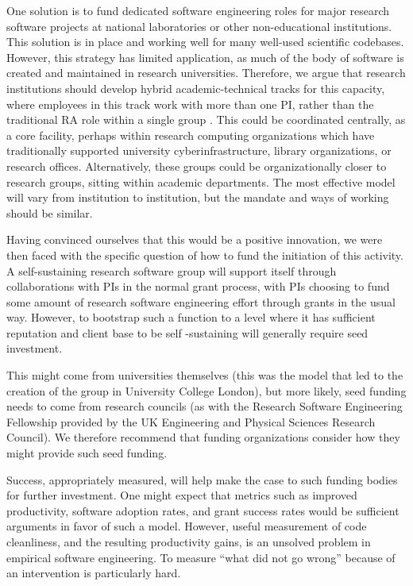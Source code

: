 One solution is to fund dedicated software engineering roles for major research software projects at national laboratories
or other non-educational institutions. This solution is in place and working well for many well-used scientific codebases.
However, this strategy has limited application, as much of the body of software is created and maintained in research
universities. Therefore, we argue that research institutions should develop hybrid academic-technical tracks for this
capacity, where employees in this track work with more than one PI, rather than the traditional RA role within a single group
. This could be coordinated centrally, as a core facility, perhaps within research computing organizations which have
traditionally supported university cyberinfrastructure, library organizations, or research offices. Alternatively, these
groups could be organizationally closer to research groups, sitting within academic departments. The most effective model
will vary from institution to institution, but the mandate and ways of working should be similar.

Having convinced ourselves that this would be a positive innovation, we were then faced with the specific question of how to
fund the initiation of this activity. A self-sustaining research software group will support itself through collaborations
with PIs in the normal grant process, with PIs choosing to fund some amount of research software engineering effort through grants in
the usual way. However, to bootstrap such a function to a level where it has sufficient reputation and client base to be self
-sustaining will generally require seed investment.

This might come from universities themselves (this was the model that led to the creation of the group in University College
London), but more likely, seed funding needs to come from research councils (as with the Research Software
Engineering Fellowship provided by the UK Engineering and Physical Sciences Research Council). We therefore recommend that
funding organizations consider how they might provide such seed funding.

Success, appropriately measured, will help make the case to such funding bodies for further investment. One might expect that metrics such as improved productivity, software adoption rates, and grant success rates would be sufficient arguments in favor of such a model. However, useful measurement of code cleanliness, and the resulting productivity gains, is an unsolved problem in empirical software engineering. To measure ``what did not go wrong'' because of an intervention is particularly hard. 

